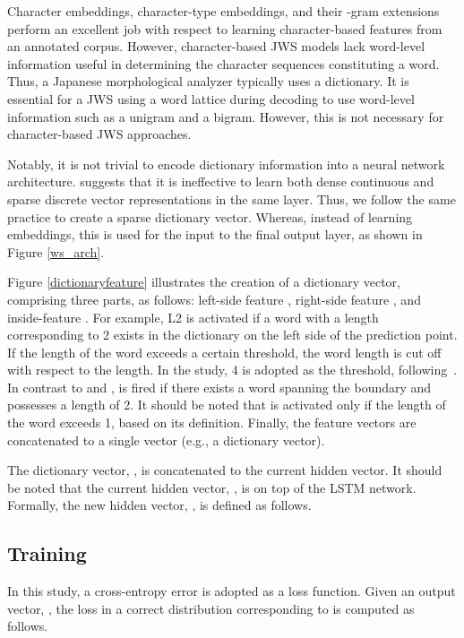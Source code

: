 \documentclass[11pt]{article}
\begin{document}
Character embeddings, character-type embeddings, and their -gram extensions
perform an excellent job with respect to learning character-based features
from an annotated corpus. However, character-based JWS models lack word-level
information useful in determining the character sequences constituting a
word.
Thus, a Japanese morphological analyzer typically uses a dictionary.
It is essential for a JWS using a word lattice during decoding to use
word-level information such as a unigram and a bigram. However, this is not
necessary for character-based JWS approaches.

Notably, it is not trivial to encode dictionary information into a neural
network architecture.
 suggests that it is ineffective to learn both
dense continuous and sparse discrete vector representations in the same layer.
Thus, we follow the same practice to create a sparse dictionary vector.
Whereas, instead of learning embeddings, this is used for the input to the
final output layer, as shown in Figure \ref{ws_arch}.

Figure \ref{dictionaryfeature} illustrates the creation of a dictionary
vector, comprising three parts, as follows: left-side feature , right-side
feature , and inside-feature . For example, L2 is activated if a word
with a length corresponding to 2 exists in the dictionary on the left side of
the prediction point. If the length of the word exceeds a certain threshold,
the word length is cut off with respect to the length. In the study, 4 is
adopted as the threshold,
following~.
In contrast to  and , 
 is fired if there exists a word spanning the boundary and possesses a
length of 2. It should be noted that  is activated only if the length of
the word exceeds 1, based on its definition.
Finally, the feature vectors are concatenated to a single vector (e.g., a
dictionary vector).

The dictionary vector, , is concatenated to the current hidden
vector. It should be noted that the current hidden vector, , is on
top of the LSTM network.
Formally, the new hidden vector, , is defined as follows.


\subsection{Training}
In this study, a cross-entropy error is adopted as a loss function. Given an
output vector, , the loss in a correct distribution corresponding to
 is computed as follows.
\end{document}
